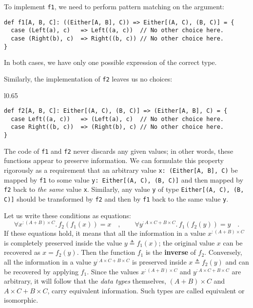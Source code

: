 To implement \lstinline!f1!, we need to perform pattern matching
on the argument:
\begin{lstlisting}
def f1[A, B, C]: ((Either[A, B], C)) => Either[(A, C), (B, C)] = {
  case (Left(a), c)   => Left((a, c))  // No other choice here.
  case (Right(b), c)  => Right((b, c)) // No other choice here.
}
\end{lstlisting}
In both cases, we have only one possible expression of the correct
type.

Similarly, the implementation of \lstinline!f2! leaves us no choices:

\begin{wrapfigure}{l}{0.65\columnwidth}%
\vspace{-0.5\baselineskip}
\begin{lstlisting}
def f2[A, B, C]: Either[(A, C), (B, C)] => (Either[A, B], C) = {
  case Left((a, c))   => (Left(a), c)  // No other choice here.
  case Right((b, c))  => (Right(b), c) // No other choice here.
}
\end{lstlisting}
\vspace{-0.9\baselineskip}
\end{wrapfigure}%

\noindent The code of \lstinline!f1! and \lstinline!f2! never discards
any given values; in other words, these functions appear to preserve
information. We can formulate this property rigorously as a requirement
that an arbitrary value \lstinline!x: (Either[A, B], C)! be mapped
by \lstinline!f1! to some value \lstinline!y: Either[(A, C), (B, C)]!
and then mapped by \lstinline!f2! back to \emph{the same} value \lstinline!x!.
Similarly, any value \lstinline!y! of type \lstinline!Either[(A, C), (B, C)]!
should be transformed by \lstinline!f2! and then by \lstinline!f1!
back to the same value \lstinline!y!.

Let us write these conditions as equations:
\[
\forall x^{:(A+B)\times C}.\,f_{2}(f_{1}(x))=x\quad,\quad\quad\forall y^{:A\times C+B\times C}.\,f_{1}\left(f_{2}(y)\right)=y\quad.
\]
If these equations hold, it means that all the information in a value
$x^{:(A+B)\times C}$ is completely preserved inside the value $y\triangleq f_{1}(x)$;
the original value $x$ can be recovered as $x=f_{2}(y)$. Then the
function $f_{1}$ is the \textbf{inverse}
of $f_{2}$. Conversely, all the information in a value $y^{:A\times C+B\times C}$
is preserved inside $x\triangleq f_{2}(y)$ and can be recovered by
applying $f_{1}$. Since the values $x^{:(A+B)\times C}$ and $y^{:A\times C+B\times C}$
are arbitrary, it will follow that the \emph{data types} themselves,
$\left(A+B\right)\times C$ and $A\times C+B\times C$, carry equivalent
information. Such types are called equivalent
or isomorphic.

